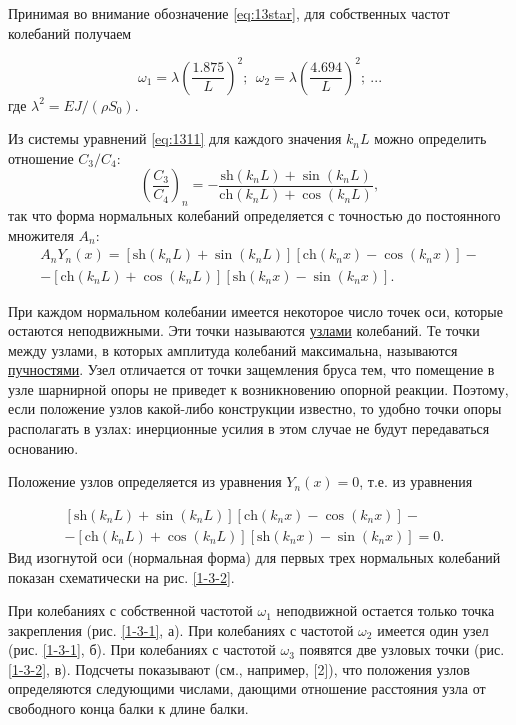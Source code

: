 \documentclass[specialist, subf, href, colorlinks=true, 14pt, final]{disser}
\theoremstyle{definition}
\begin{document}
Принимая во внимание обозначение \eqref{eq:13star}, для собственных 
частот колебаний получаем
\addtocounter{equation}{1}
\begin{equation}\label{eq:1314}
  \omega_{1} = \lambda\left(\frac{1.875}{L}\right)^{2};\ \ \omega_{2} = \lambda\left(\frac{4.694}{L}\right)^{2};\ ...
  \tag{14}
\end{equation}
где $\lambda^{2} = EJ/(\rho S_{0})$.

Из системы уравнений \eqref{eq:1311} для каждого значения $k_{n}L$ можно определить отношение $C_{3}/C_{4}$:
{\large
\[
  \left(\frac{C_3}{C_4}\right)_{n} = -\frac{\text{sh}(k_{n}L) + \sin(k_{n}L)}{\text{ch}(k_{n}L) + \cos(k_{n}L)},
\]
}
так что форма нормальных колебаний определяется с точностью до
постоянного множителя $A_n$:
{\large
\[
  \begin{aligned}
  A_{n}Y_{n}(x) = \left[\text{sh}(k_{n}L) + \sin(k_{n}L)\right]\left[\text{ch}(k_{n}x) - \cos(k_{n}x)\right] - \\
   - \left[\text{ch}(k_{n}L) + \cos(k_{n}L)\right]\left[\text{sh}(k_{n}x) - \sin(k_{n}x)\right].
  \end{aligned}
\]
}

При каждом нормальном колебании имеется некоторое число точек оси, которые остаются неподвижными. Эти точки называются \underline{узлами} колебаний. Те точки между узлами, в которых амплитуда колебаний максимальна, называются \underline{пучностями}. Узел отличается от точки защемления бруса тем, что помещение в узле шарнирной опоры не приведет к возникновению опорной реакции. Поэтому, если положение узлов какой-либо конструкции известно, то удобно точки опоры располагать в узлах: инерционные усилия в этом случае не будут передаваться основанию.

Положение узлов определяется из уравнения $Y_{n}(x) = 0$, т.е. из уравнения
\addtocounter{equation}{1}
\begin{equation}\label{eq:1315}
  \begin{aligned}
  \left[\text{sh}(k_{n}L) + \sin(k_{n}L)\right]\left[\text{ch}(k_{n}x) - \cos(k_{n}x)\right] - &\\
   - \left[\text{ch}(k_{n}L) + \cos(k_{n}L)\right]\left[\text{sh}(k_{n}x) - \sin(k_{n}x)\right] = 0.&
  \end{aligned}
  \tag{15}
\end{equation}
Вид изогнутой оси (нормальная форма) для первых трех нормальных
колебаний показан схематически на рис. \ref{1-3-2}.

При колебаниях с собственной частотой $\omega_{1}$ неподвижной остается только точка закрепления (рис. \ref{1-3-1}, а). При колебаниях с частотой $\omega_2$ имеется один узел (рис. \ref{1-3-1}, б). При колебаниях с частотой $\omega_3$ появятся две узловых точки (рис. \ref{1-3-2}, в). Подсчеты показывают (см., например, [2]), что положения узлов определяются следующими числами, дающими отношение расстояния узла от свободного конца балки к длине балки.
\end{document}
